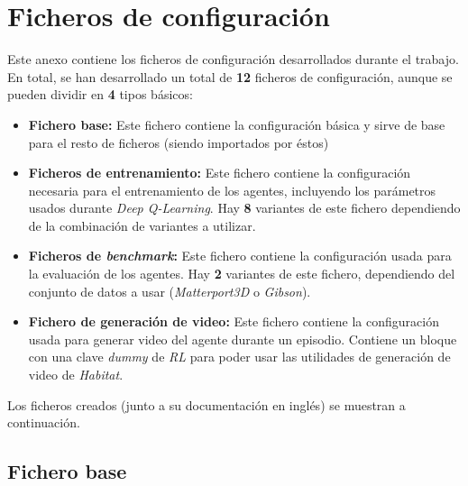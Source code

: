 \chapter{Ficheros de configuración}

Este anexo contiene los ficheros de configuración desarrollados durante el trabajo. En total, se han desarrollado un total de \textbf{12} ficheros de configuración, aunque se pueden dividir en \textbf{4} tipos básicos:

\begin{itemize}
	\item \textbf{Fichero base:} Este fichero contiene la configuración básica y sirve de base para el resto de ficheros (siendo importados por éstos)
	\item \textbf{Ficheros de entrenamiento:} Este fichero contiene la configuración necesaria para el entrenamiento de los agentes, incluyendo los parámetros usados durante \textit{Deep Q-Learning}. Hay \textbf{8} variantes de este fichero dependiendo de la combinación de variantes a utilizar.
	\item \textbf{Ficheros de \textit{benchmark}:} Este fichero contiene la configuración usada para la evaluación de los agentes. Hay \textbf{2} variantes de este fichero, dependiendo del conjunto de datos a usar (\textit{Matterport3D} o \textit{Gibson}).
	\item \textbf{Fichero de generación de video:} Este fichero contiene la configuración usada para generar video del agente durante un episodio. Contiene un bloque con una clave \textit{dummy} de \textit{RL} para poder usar las utilidades de generación de video de \textit{Habitat}.
\end{itemize}

Los ficheros creados (junto a su documentación en inglés) se muestran a continuación.

\section{Fichero base}

